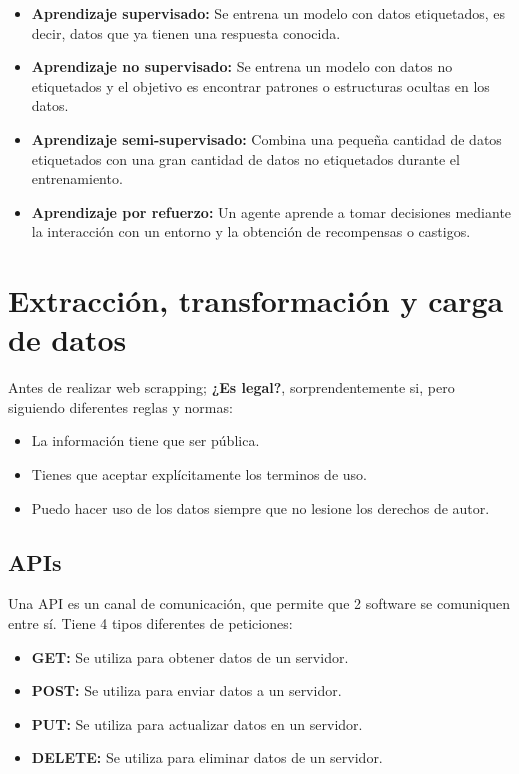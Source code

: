 \begin{itemize}
    \item \textbf{Aprendizaje supervisado:} Se entrena un modelo con datos etiquetados, es decir, datos que ya tienen una respuesta conocida.
    \item \textbf{Aprendizaje no supervisado:} Se entrena un modelo con datos no etiquetados y el objetivo es encontrar patrones o estructuras ocultas en los datos.
    \item \textbf{Aprendizaje semi-supervisado:} Combina una pequeña cantidad de datos etiquetados con una gran cantidad de datos no etiquetados durante el entrenamiento.
    \item \textbf{Aprendizaje por refuerzo:} Un agente aprende a tomar decisiones mediante la interacción con un entorno y la obtención de recompensas o castigos.
\end{itemize}


\section{\bfseries Extracción, transformación y carga de datos}

Antes de realizar web scrapping; \textbf{¿Es legal?}, sorprendentemente si, pero siguiendo diferentes reglas y normas:
\begin{multicols}{2}
    \begin{itemize}
        \item La información tiene que ser pública.
        \item Tienes que aceptar explícitamente los terminos de uso.
        \item Puedo hacer uso de los datos siempre que no lesione los derechos de autor.
    \end{itemize}
\end{multicols}

\subsection{\bfseries APIs}

Una API es un canal de comunicación, que permite que 2 software se comuniquen entre sí. Tiene 4 tipos diferentes de peticiones:
\begin{tcolorbox}[title=Peticiones API]
    \begin{itemize}
        \item \textbf{GET:} Se utiliza para obtener datos de un servidor.
        \item \textbf{POST:} Se utiliza para enviar datos a un servidor.
        \item \textbf{PUT:} Se utiliza para actualizar datos en un servidor.
        \item \textbf{DELETE:} Se utiliza para eliminar datos de un servidor.
    \end{itemize}
\end{tcolorbox}

